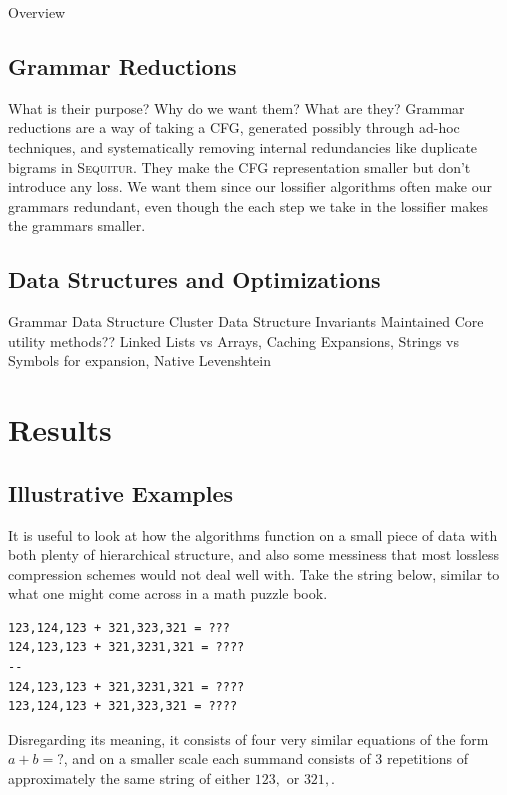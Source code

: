 \documentclass[11pt]{article}
\newcommand{\Sequitur}{\textsc{Sequitur}\xspace}
\begin{document}
Overview

\subsection{Grammar Reductions}

What is their purpose? Why do we want them? What are they?  Grammar reductions
are a way of taking a CFG, generated possibly through ad-hoc techniques, and
systematically removing internal redundancies like duplicate bigrams in
\Sequitur. They make the CFG representation smaller but don't introduce any
loss. We want them since our lossifier algorithms often make our grammars
redundant, even though the each step we take in the lossifier makes the
grammars smaller.

\subsection{Data Structures and Optimizations}

Grammar Data Structure
Cluster Data Structure
Invariants Maintained
Core utility methods??
Linked Lists vs Arrays, Caching Expansions, Strings vs Symbols for expansion, Native Levenshtein

\section{Results}

\subsection{Illustrative Examples}

It is useful to look at how the algorithms function on a small piece of data
with both plenty of hierarchical structure, and also some messiness that most
lossless compression schemes would not deal well with. Take the string below,
similar to what one might come across in a math puzzle book.

\begin{verbatim}
123,124,123 + 321,323,321 = ???
124,123,123 + 321,3231,321 = ????
--
124,123,123 + 321,3231,321 = ????
123,124,123 + 321,323,321 = ????
\end{verbatim}

Disregarding its meaning, it consists of four very similar equations of the
form $a + b = ?$, and on a smaller scale each summand consists of 3 repetitions
of approximately the same string of either $123,$ or $321,$.
\end{document}
